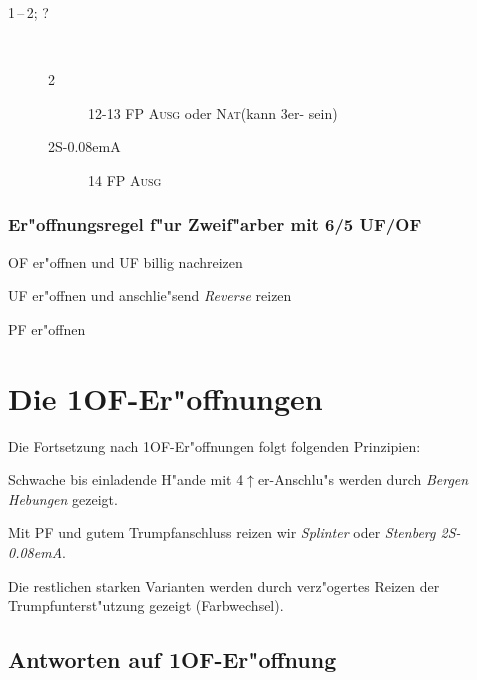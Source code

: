 \documentclass[11pt,german,twocolumn]{scrartcl}
\def\kar{\nobreak\hspace{\cardskip}\Di\xspace}
\def\tre{\nobreak\hspace{\cardskip}\Cl\xspace}
\def\ka{\Di\xspace}
\def\bad{$^-$\xspace}
\def\pl{$\uparrow$\xspace}
\def\uf{\nobreak\hspace{\cardskip}\textsf{UF}\xspace}
\def\of{\nobreak\hspace{\cardskip}\textsf{OF}\xspace}
\def\sa{\nobreak\textsf{S\kern-0.08emA}\xspace}
\def\SA{\nobreak\hspace{\cardskip}\sa}
\def\sep{\,--\,}
\newcommand{\conv}[1]{\emph{#1}}
\def\bal{\textsc{Ausg}\xspace}
\def\nat{\textsc{Nat}\xspace}
\def\pf{\textsc{PF}\xspace}
\def\bdsc{\begin{description}}
\def\edsc{\end{description}}
\newcommand{\Index}[1]{#1\index{#1}}
\begin{document}
\bdsc
  \item[1\kar{}\sep2\tre; ?]~
    \bdsc
    \item[2\kar] 12-13 FP \bal oder \nat (kann 3er-\ka sein)
    \item[2\SA] 14 FP \bal
    \edsc
\edsc


\subsubsection*{\label{zfregel}Er"offnungsregel f"ur Zweif"arber mit 6/5 \uf/\of}

\bdsc
\setlength{\labelsep}{1ex}
\item[4\pl{} Verlierer:] \of er"offnen und \uf billig nachreizen
\item[3-4 Verlierer:] \uf er"offnen und anschlie"send \conv{Reverse}
  reizen
\item[0-3\bad{} Verlierer:] \pf er"offnen
\edsc

\newpage
\section{Die 1\of-Er"offnungen}

Die Fortsetzung nach 1\of-Er"offnungen folgt folgenden Prinzipien:
\begin{compactitem}
\setlength{\itemsep}{0.5ex}
\item Schwache bis einladende H"ande mit 4\pl{}er-Anschlu"s werden durch
  \conv{Bergen Hebungen} gezeigt.
\item Mit \pf und gutem Trumpfanschluss reizen wir
  \conv{\Index{Splinter}} oder \conv{Stenberg 2\SA}.
\item Die restlichen starken Varianten werden durch verz"ogertes
  Reizen der Trumpfunterst"utzung gezeigt (Farbwechsel).
\end{compactitem}

\subsection{Antworten auf 1\of-Er"offnung}
\end{document}
